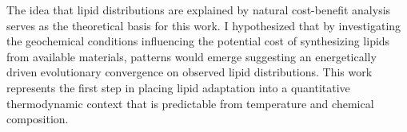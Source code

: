 The idea that lipid distributions are explained by natural cost-benefit analysis serves as the theoretical basis for this work. I hypothesized that by investigating the geochemical conditions influencing the potential cost of synthesizing lipids from available materials, patterns would emerge suggesting an energetically driven evolutionary convergence on observed lipid distributions. This work represents the first step in placing lipid adaptation into a quantitative thermodynamic context that is predictable from temperature and chemical composition.

